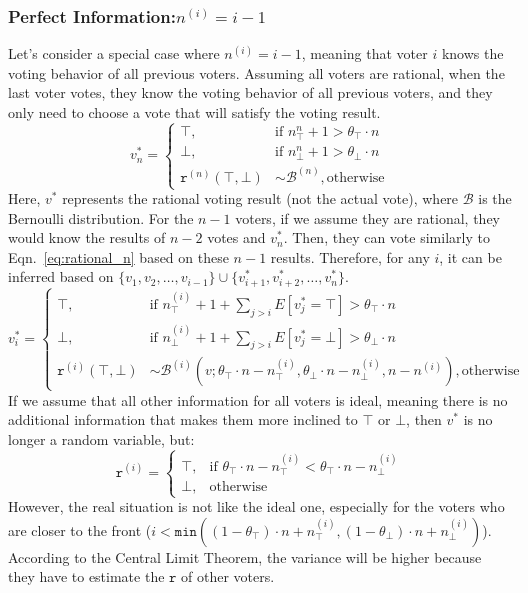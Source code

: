 \documentclass[11pt]{article}
\begin{document}
\subsubsection{Perfect Information:$n^{(i)}=i-1$}
\label{sec:perfect_information}
Let's consider a special case where $n^{(i)}=i-1$, meaning that voter $i$ knows the voting behavior of all previous voters. Assuming all voters are rational, when the last voter votes, they know the voting behavior of all previous voters, and they only need to choose a vote that will satisfy the voting result.
\begin{equation}
  \label{eq:rational_n}
  v^*_n = 
  \begin{cases}
    \top, &\text{if }n^n_\top+1>\theta_\top\cdot n\\
    \bot, &\text{if }n^n_\bot+1>\theta_\bot\cdot n\\
    \texttt{r}^{(n)}(\top,\bot) &\sim \mathcal{B}^{(n)}, \text{otherwise}
  \end{cases}
\end{equation}
Here, $v^*$ represents the rational voting result (not the actual vote), where $\mathcal{B}$ is the Bernoulli distribution.
For the $n-1$ voters, if we assume they are rational, they would know the results of $n-2$ votes and $v^*_n$. Then, they can vote similarly to Eqn.~\ref{eq:rational_n} based on these $n-1$ results. Therefore, for any $i$, it can be inferred based on $\{v_1,v_2, \ldots,v_{i-1}\} \cup \{v^*_{i+1},v^*_{i+2},\ldots,v^*_n\}$.
\begin{equation}
  \label{eq:rational_i}
  v^*_i = 
  \begin{cases}
    \top, &\text{if }n^{(i)}_\top+1+\sum_{j>i}{E[v^*_j=\top]}>\theta_\top\cdot n\\
    \bot, &\text{if }n^{(i)}_\bot+1+\sum_{j>i}{E[v^*_j=\bot]}>\theta_\bot\cdot n\\
    \texttt{r}^{(i)}(\top,\bot) &\sim \mathcal{B}^{(i)}(v;\theta_\top\cdot n-n^{(i)}_\top,\theta_\bot\cdot n-n^{(i)}_\bot,n-n^{(i)}), \text{otherwise}
  \end{cases}
\end{equation}
If we assume that all other information for all voters is ideal, meaning there is no additional information that makes them more inclined to $\top$ or $\bot$, then $v^*$ is no longer a random variable, but:
\begin{equation}
  \label{eq:rational_determined}
  \texttt{r}^{(i)} = 
  \begin{cases}
    \top, &\text{if }\theta_\top\cdot n-n^{(i)}_\top<\theta_\top\cdot n-n^{(i)}_\bot\\
    \bot, &\text{otherwise}
  \end{cases}
\end{equation}
However, the real situation is not like the ideal one, especially for the voters who are closer to the front ($i<\texttt{min}((1-\theta_\top)\cdot n+n_\top^{(i)},(1-\theta_\bot)\cdot n+n_\bot^{(i)})$). According to the Central Limit Theorem, the variance will be higher because they have to estimate the $\texttt{r}$ of other voters.
\end{document}
